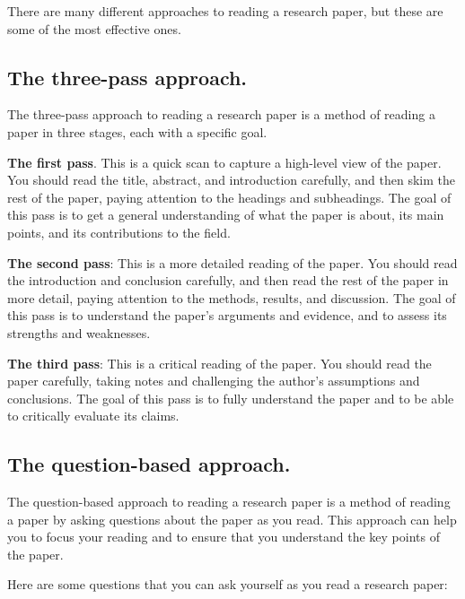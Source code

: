 \documentclass[
  b5paper]{book}
\begin{document}
There are many different approaches to reading a research paper, but these are some of the most effective ones.

\hypertarget{the-three-pass-approach.}{%
\subsection*{The three-pass approach.}\label{the-three-pass-approach.}}

The three-pass approach to reading a research paper is a method of reading a paper in three stages, each with a specific goal.

\textbf{The first pass}. This is a quick scan to capture a high-level view of the paper. You should read the title, abstract, and introduction carefully, and then skim the rest of the paper, paying attention to the headings and subheadings. The goal of this pass is to get a general understanding of what the paper is about, its main points, and its contributions to the field.

\textbf{The second pass}: This is a more detailed reading of the paper. You should read the introduction and conclusion carefully, and then read the rest of the paper in more detail, paying attention to the methods, results, and discussion. The goal of this pass is to understand the paper's arguments and evidence, and to assess its strengths and weaknesses.

\textbf{The third pass}: This is a critical reading of the paper. You should read the paper carefully, taking notes and challenging the author's assumptions and conclusions. The goal of this pass is to fully understand the paper and to be able to critically evaluate its claims.

\hypertarget{the-question-based-approach.}{%
\subsection*{The question-based approach.}\label{the-question-based-approach.}}

The question-based approach to reading a research paper is a method of reading a paper by asking questions about the paper as you read. This approach can help you to focus your reading and to ensure that you understand the key points of the paper.

Here are some questions that you can ask yourself as you read a research paper:
\end{document}
